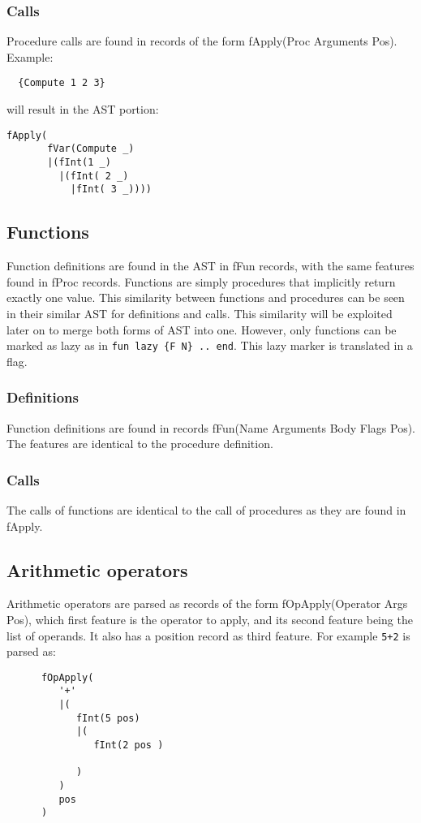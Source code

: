 \documentclass[a4paper]{memoir}
\begin{document}
\subsubsection{Calls}
Procedure calls are found in records of the form fApply(Proc Arguments Pos). 
Example:

\begin{lstlisting}
  {Compute 1 2 3}
\end{lstlisting}

will result in the AST portion:
\begin{lstlisting}
fApply(
       fVar(Compute _)
       |(fInt(1 _)
         |(fInt( 2 _)
           |fInt( 3 _))))
\end{lstlisting}

\subsection{Functions}\label{sec:input:functions}
Function definitions are found in the AST in fFun records, with the same features found in fProc records. Functions are simply procedures that implicitly return exactly one value. This similarity between functions and procedures can be seen in their similar AST for definitions and calls. This similarity will be exploited later on to merge both forms of AST into one.
However, only functions can be marked as lazy as in \lstinline!fun lazy {F N} .. end!. This lazy marker is translated in a flag.
\subsubsection{Definitions}
Function definitions are found in records fFun(Name Arguments Body Flags Pos). The features are identical to the procedure definition.
\subsubsection{Calls}
The calls of functions are identical to the call of procedures as they are found in fApply.
\subsection{Arithmetic operators}\label{sec:input:operators}
Arithmetic operators are parsed as records of the form fOpApply(Operator Args Pos), which first feature is the operator to apply, and its second feature being the list of operands. It also has a position record as third feature. For example
\lstinline!5+2! is parsed as:
\begin{lstlisting}
      fOpApply(
         '+'
         |(
            fInt(5 pos)
            |(
               fInt(2 pos )
               
            )
         )
         pos
      )

\end{lstlisting}
\end{document}
